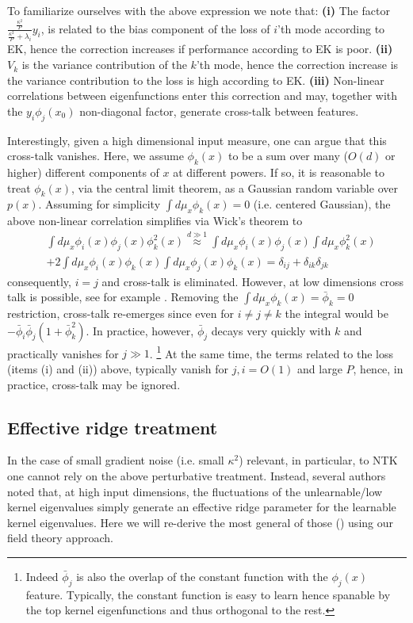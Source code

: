 To familiarize ourselves with the above expression we note that: {\bf (i)} The factor $\frac{\frac{\kappa^2}{P}}{\frac{\kappa^2}{P} + \lambda_i} y_i$, is related to the bias component of the loss of $i$'th mode according to EK, hence the correction increases if performance according to EK is poor. {\bf (ii)} $V_k$ is the variance contribution of the $k$'th mode, hence the correction increase is the variance contribution to the loss is high according to EK. {\bf (iii)} Non-linear correlations between eigenfunctions enter this correction and may, together with the $y_i \phi_j(x_0)$ non-diagonal factor, generate cross-talk between features. 

Interestingly, given a high dimensional input measure, one can argue that this cross-talk vanishes. Here, we assume $\phi_k(x)$ to be a sum over many ($O(d)$ or higher) different components of $x$ at different powers. If so, it is reasonable to treat $\phi_k(x)$, via the central limit theorem, as a Gaussian random variable over $p(x)$. Assuming for simplicity $\int d\mu_x \phi_k(x)=0$ (i.e. centered Gaussian), the above non-linear correlation simplifies via Wick's theorem to 
\begin{align}
&\int d\mu_x \phi_i(x)\phi_j(x)\phi^2_k(x) \stackrel{d \gg 1}{\approx} \int d\mu_x \phi_i(x)\phi_j(x) \int d\mu_x \phi_k^2(x) \\ \nonumber 
&+ 2\int d\mu_x \phi_i(x)\phi_k(x) \int d\mu_x \phi_j(x) \phi_k(x) = \delta_{ij}+\delta_{ik} \delta_{jk}
\end{align}
consequently, $i=j$ and cross-talk is eliminated. However, at low dimensions cross talk is possible, see for example \citep{Tomasini2022,howard2024}. Removing the $\int d\mu_x \phi_k(x)=\bar{\phi}_k=0$ restriction, cross-talk re-emerges since even for $i\neq j \neq k$ the integral would be $-\bar{\phi}_i\bar{\phi}_j(1+\bar{\phi}^2_k)$. In practice, however, $\bar{\phi}_j$ decays very quickly with $k$ and practically vanishes for $j\gg 1$. \footnote{Indeed $\bar{\phi}_j$ is also the overlap of the constant function with the $\phi_j(x)$ feature. Typically, the constant function is easy to learn hence spanable by the top kernel eigenfunctions and thus orthogonal to the rest.} At the same time, the terms related to the loss (items (i) and (ii)) above, typically vanish for $j,i=O(1)$ and large $P$, hence, in practice, cross-talk may be ignored. 

\subsection{Effective ridge treatment}
\label{SSec:Canatar}
In the case of small gradient noise (i.e. small $\kappa^2$) relevant, in particular, to NTK one cannot rely on the above perturbative treatment. Instead, several authors \citep{Tsigler2020,cohen2021learning,Canatar2021} noted that, at high input dimensions, the fluctuations of the unlearnable/low kernel eigenvalues simply generate an effective ridge parameter for the learnable kernel eigenvalues. Here we will re-derive the most general of those (\cite{Canatar2021, Sollich2001}) using our field theory approach. 

